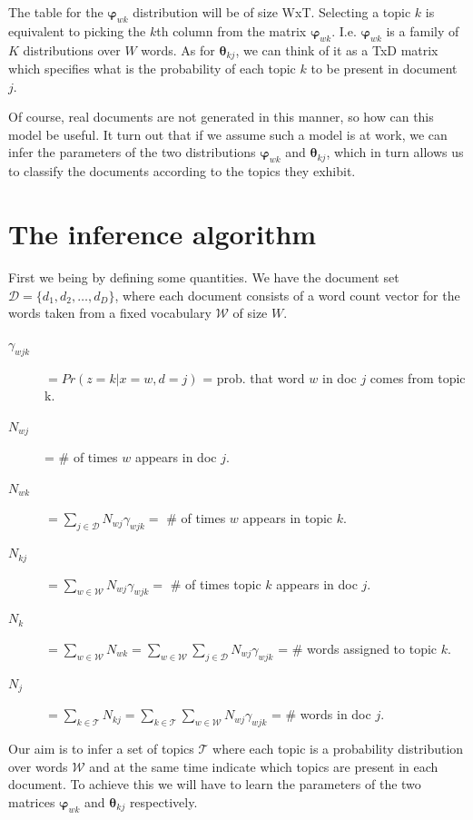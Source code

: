 \documentclass[11pt]{article}
\newcommand{\boldsymbol}[1]{\mathbf{#1}}
\newcommand{\DD}{\mathcal{D}}
\newcommand{\WW}{\mathcal{W}}
\newcommand{\TT}{\mathcal{T}}
\begin{document}
    The table for the $\boldsymbol{\varphi}_{wk}$ distribution will be of size WxT.
    Selecting a topic $k$ is equivalent to picking the $k$th column from the matrix
    $\boldsymbol{\varphi}_{wk}$.
    I.e. $\boldsymbol{\varphi}_{wk}$ is a family of $K$ distributions over $W$ words.
    As for $\boldsymbol{\theta}_{kj}$, we can think of it as a TxD matrix which specifies
    what is the probability of each topic $k$ to be present in document $j$.

    Of course, real documents are not generated in this manner, so how can this model
    be useful.
    It turn out that if we assume such a model is at work, we can infer the parameters of the
    two distributions $\boldsymbol{\varphi}_{wk}$ and $\boldsymbol{\theta}_{kj}$, which
    in turn allows us to classify the documents according to the topics they exhibit.






\section{The inference algorithm}

    First we being by defining some quantities.  
    We have the document set $\DD = \{ d_1, d_2, \ldots, d_D \}$, where each document consists of 
    a word count vector for the words taken from a fixed vocabulary $\WW$ of size $W$.
    
    \begin{description}
	\item[$\gamma_{wjk}$]	$=Pr( z=k | x=w,d=j)$ = prob. that word $w$ in doc $j$ comes from topic k.
	\item[$N_{wj}$] = \# of times $w$ appears in doc $j$. 
	\item[$N_{wk}$]  $=\displaystyle\sum_{j\in \DD} N_{wj}\gamma_{wjk} = $ \# of times $w$ appears in topic $k$.
	\item[$N_{kj}$]  $=\displaystyle\sum_{w\in \WW} N_{wj}\gamma_{wjk} = $ \# of times topic $k$ appears in doc $j$.
	\item[$N_{k}$]  $=\displaystyle\sum_{w\in \WW} N_{wk}=  \displaystyle\sum_{w\in \WW}\sum_{j\in \DD} N_{wj}\gamma_{wjk} $ = \# words assigned to  topic $k$.
	\item[$N_{j}$]  $=\displaystyle\sum_{k \in \TT} N_{kj} =  \displaystyle\sum_{k \in \TT}\sum_{w\in \WW}N_{wj}\gamma_{wjk} $ = \# words in doc $j$.
    \end{description}

    Our aim is to infer a set of topics $\TT$ where each topic is a probability distribution over words $\WW$
    and at the same time indicate which topics are present in each document.
    To achieve this we will have to learn the parameters of the two matrices
    $\boldsymbol{\varphi}_{wk}$ and $\boldsymbol{\theta}_{kj}$ respectively.
\end{document}

